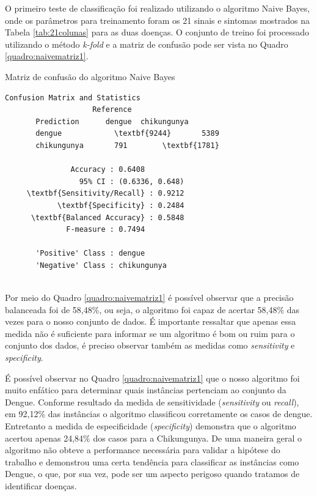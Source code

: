 O primeiro teste de classificação foi realizado utilizando o algoritmo Naive Bayes, onde os parâmetros para treinamento foram os 21 sinais e sintomas mostrados na Tabela \ref{tab:21colunas}  para as duas doenças. O conjunto de treino foi processado utilizando o método \textit{k-fold} e a matriz de confusão pode ser vista no Quadro \ref{quadro:naivematriz1}.

\begin{quadro}
\caption{\label{quadro:naivematriz1}Matriz de confusão do algoritmo Naive Bayes}
\begingroup
    \fontsize{10pt}{9pt}\selectfont
    \begin{Verbatim}[commandchars=\\\{\}]
      Confusion Matrix and Statistics
                    Reference
       Prediction      dengue  chikungunya
       dengue            \textbf{9244}       5389
       chikungunya       791        \textbf{1781}
                                         
               Accuracy : 0.6408         
                 95% CI : (0.6336, 0.648)
     \textbf{Sensitivity/Recall} : 0.9212         
            \textbf{Specificity} : 0.2484         
      \textbf{Balanced Accuracy} : 0.5848
              F-measure : 0.7494        
         
       'Positive' Class : dengue 
       'Negative' Class : chikungunya
  
    \end{Verbatim}  
\endgroup
{}
\end{quadro}
\newpage

Por meio do Quadro \ref{quadro:naivematriz1} é possível observar que a precisão balanceada foi de 58,48\%, ou seja, o algoritmo foi capaz de acertar 58,48\% das vezes para o nosso conjunto de dados. É importante ressaltar que apenas essa medida não é suficiente para informar se um algoritmo é bom ou ruim para o conjunto dos dados, é preciso observar também as medidas como \textit{sensitivity} e \textit{specificity}.

É possível observar no Quadro \ref{quadro:naivematriz1} que o nosso algoritmo foi muito enfático para determinar quais instâncias pertenciam ao conjunto da Dengue. Conforme resultado da medida de sensitividade (\textit{sensitivity} ou \textit{recall}), em 92,12\% das instâncias o algoritmo classificou corretamente os casos de dengue. Entretanto a medida de especificidade (\textit{specificity}) demonstra que o algoritmo acertou apenas 24,84\% dos casos para a Chikungunya. De uma maneira geral o algoritmo não obteve a performance necessária para validar a hipótese do trabalho e demonstrou uma certa tendência para classificar as instâncias como Dengue, o que, por sua vez, pode ser um aspecto perigoso quando tratamos de identificar doenças.

